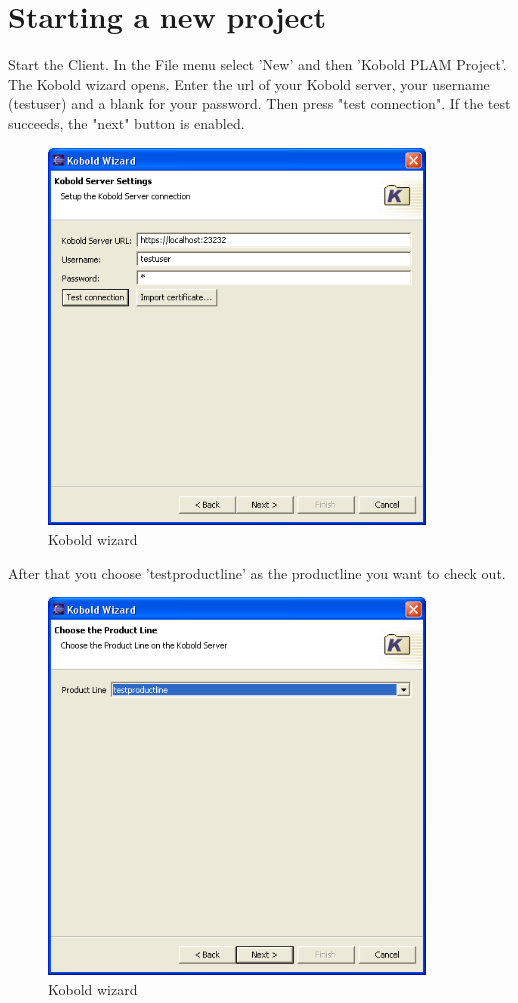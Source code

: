 \section{Starting a new project}

Start the Client.
In the File menu select 'New' and then 'Kobold PLAM Project'. The Kobold wizard opens.
Enter the url of your Kobold server, your username (testuser) and a blank for your password. Then press
"test connection". If the test succeeds, the "next" button is enabled.

\begin{figure}[h!]
\begin{center}
\includegraphics[width=10cm]{tutorial4.png}
   \caption{Kobold wizard}
\end{center}
\end{figure}\par

After that you choose 'testproductline' as the productline you want to check out.

\begin{figure}[h!]
\begin{center}
\includegraphics[width=10cm]{tutorial5.png}
   \caption{Kobold wizard}
\end{center}
\end{figure}\par

